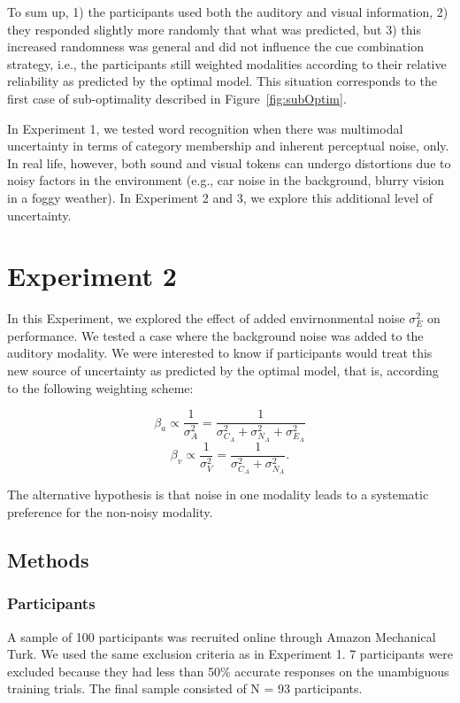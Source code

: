 \documentclass[english,,man,floatsintext]{apa6}
\theoremstyle{definition}
\theoremstyle{definition}
\theoremstyle{definition}
\theoremstyle{remark}
\begin{document}
To sum up, 1) the participants used both the auditory and visual
information, 2) they responded slightly more randomly that what was
predicted, but 3) this increased randomness was general and did not
influence the cue combination strategy, i.e., the participants still
weighted modalities according to their relative reliability as predicted
by the optimal model. This situation corresponds to the first case of
sub-optimality described in Figure~\ref{fig:subOptim}.

In Experiment 1, we tested word recognition when there was multimodal
uncertainty in terms of category membership and inherent perceptual
noise, only. In real life, however, both sound and visual tokens can
undergo distortions due to noisy factors in the environment (e.g., car
noise in the background, blurry vision in a foggy weather). In
Experiment 2 and 3, we explore this additional level of uncertainty.

\section{Experiment 2}\label{experiment-2}

In this Experiment, we explored the effect of added envirnonmental noise
\(\sigma^2_{E}\) on performance. We tested a case where the background
noise was added to the auditory modality. We were interested to know if
participants would treat this new source of uncertainty as predicted by
the optimal model, that is, according to the following weighting scheme:

\[\beta_a \propto \frac{1}{\sigma^2_{A}} = \frac{1}{\sigma^2_{C_A}+\sigma^2_{N_A} + \sigma^2_{E_A}}\]
\[\beta_v \propto \frac{1}{\sigma^2_{V}} = \frac{1}{\sigma^2_{C_A}+\sigma^2_{N_A}}.\]

The alternative hypothesis is that noise in one modality leads to a
systematic preference for the non-noisy modality.

\subsection{Methods}\label{methods-1}

\subsubsection{Participants}\label{participants-1}

A sample of 100 participants was recruited online through Amazon
Mechanical Turk. We used the same exclusion criteria as in Experiment 1.
7 participants were excluded because they had less than 50\% accurate
responses on the unambiguous training trials. The final sample consisted
of N = 93 participants.
\end{document}
